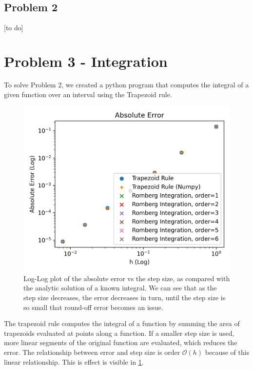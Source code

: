 \documentclass[10pt,letterpaper]{article}
\begin{document}
    \subsection{Problem 2}
    [to do]
    \section{Problem 3 - Integration} 
   To solve Problem 2, we created a python program that computes the integral of a given function over an interval using the Trapezoid rule. 

    \begin{figure}
        \centering
        \includegraphics[width=0.6\linewidth]{../plots/integration.png}
        \caption{Log-Log plot of the absolute error vs the step size, as compared with the analytic solution of a known integral. We can see that as the step size decreases, the error decreases in turn, until the step size is so small that round-off error becomes an issue.}
        \label{fig:integration_err}
    \end{figure}
    The trapezoid rule computes the integral of a function by summing the area of trapezoids evaluated at points along a function. If a smaller step size is used, more linear segments of the original function are evaluated, which reduces the error. The relationship between error and step size is order $\mathcal{O}(h)$ because of this linear relationship. This is effect is visible in \cref{fig:integration_err}.
\end{document}
